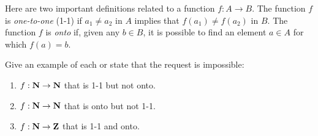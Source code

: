 \documentclass{lew98_solutions}
\begin{document}
\begin{exercise}
\label{ex:1.2.8}
    Here are two important definitions related to a function \( f : A \to B \). The function \( f \) is \textit{one-to-one} (1-1) if \( a_1 \neq a_2 \) in \( A \) implies that \( f(a_1) \neq f(a_2) \) in \( B \). The function \( f \) is \textit{onto} if, given any \( b \in B \), it is possible to find an element \( a \in A \) for which \( f(a) = b \).

    Give an example of each or state that the request is impossible:
    \begin{enumerate}
        \item \( f : \mathbf{N} \to \mathbf{N} \) that is 1-1 but not onto.

        \item \( f : \mathbf{N} \to \mathbf{N} \) that is onto but not 1-1.

        \item \( f : \mathbf{N} \to \mathbf{Z} \) that is 1-1 and onto.
    \end{enumerate}
\end{exercise}
\end{document}
